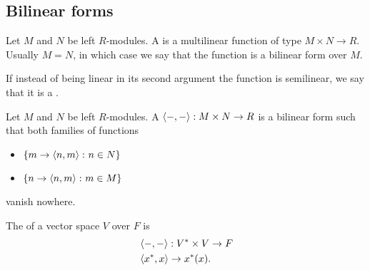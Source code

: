 \subsection{Bilinear forms}\label{subsec:bilinear_forms}

\begin{definition}\label{def:bilinear_form}\cite[249]{Knapp2016BAlg}
  Let \( M \) and \( N \) be left \( R \)-modules. A  is a multilinear function of type \( M \times N \to R \). Usually \( M = N \), in which case we say that the function is a bilinear form over \( M \).

  If instead of being linear in its second argument the function is semilinear, we say that it is a .
\end{definition}

\begin{definition}\label{def:duality_pairing}
  Let \( M \) and \( N \) be left \( R \)-modules. A  \( \left\langle -, - \right\rangle: M \times N \to R \) is a bilinear form such that both families of functions
  \begin{itemize}
    \item \( \{ m \to \left\langle n, m \right\rangle \colon n \in N \} \)
    \item \( \{ n \to \left\langle n, m \right\rangle \colon m \in M \} \)
  \end{itemize}
  vanish nowhere.

  The  of a vector space \( V \) over \( F \) is
  \begin{align*}
    &\left\langle -, - \right\rangle: V^* \times V \to F \\
    &\left\langle x^*, x \right\rangle \to x^*(x).
  \end{align*}
\end{definition}


